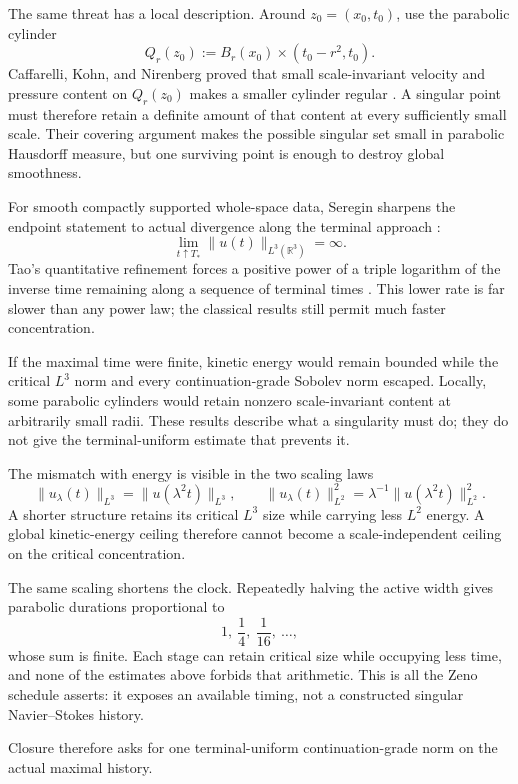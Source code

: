 The same threat has a local description.  Around
\(z_0=(x_0,t_0)\), use the parabolic cylinder
\[
  Q_r(z_0)
  :=
  B_r(x_0)\times(t_0-r^2,t_0).
\]
Caffarelli, Kohn, and Nirenberg proved that small scale-invariant velocity and
pressure content on \(Q_r(z_0)\) makes a smaller cylinder regular
\parencite{CaffarelliKohnNirenberg1982}.  A singular point must therefore retain
a definite amount of that content at every sufficiently small scale.  Their
covering argument makes the possible singular set small in parabolic Hausdorff
measure, but one surviving point is enough to destroy global smoothness.

For smooth compactly supported whole-space data, Seregin sharpens the endpoint
statement to actual divergence along the terminal approach
\parencite{Seregin2012}:
\[
  \lim_{t\uparrow T_*}
  \lVert u(t)\rVert_{L^3(\mathbb R^3)}
  =\infty.
\]
Tao’s quantitative refinement forces a positive power of a triple logarithm of
the inverse time remaining along a sequence of terminal times
\parencite{Tao2021Quantitative}.  This lower rate is far slower than any power
law; the classical results still permit much faster concentration.


If the maximal time were finite, kinetic energy would remain bounded while the
critical \(L^3\) norm and every continuation-grade Sobolev norm escaped.
Locally, some parabolic cylinders would retain nonzero scale-invariant content
at arbitrarily small radii.  These results describe what a singularity must do;
they do not give the terminal-uniform estimate that prevents it.

The mismatch with energy is visible in the two scaling laws
\[
  \lVert u_\lambda(t)\rVert_{L^3}
  =
  \lVert u(\lambda^2t)\rVert_{L^3},
  \qquad
  \lVert u_\lambda(t)\rVert_{L^2}^2
  =
  \lambda^{-1}
  \lVert u(\lambda^2t)\rVert_{L^2}^2.
\]
A shorter structure retains its critical \(L^3\) size while carrying less
\(L^2\) energy.  A global kinetic-energy ceiling therefore cannot become a
scale-independent ceiling on the critical concentration.

The same scaling shortens the clock.  Repeatedly halving the active width gives
parabolic durations proportional to
\[
  1,\ \frac14,\ \frac1{16},\ \ldots,
\]
whose sum is finite.  Each stage can retain critical size while occupying less
time, and none of the estimates above forbids that arithmetic.  This is all the
Zeno schedule asserts: it exposes an available timing, not a constructed
singular Navier--Stokes history.

Closure therefore asks for one terminal-uniform continuation-grade norm on the
actual maximal history.
